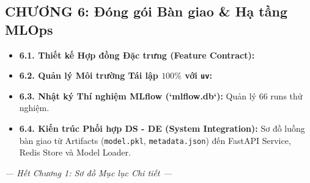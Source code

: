 \subsection*{CHƯƠNG 6: Đóng gói Bàn giao \& Hạ tầng MLOps}
\begin{itemize}[leftmargin=*]
    \item \textbf{6.1. Thiết kế Hợp đồng Đặc trưng (Feature Contract):}
    \item \textbf{6.2. Quản lý Môi trường Tái lập $100\%$ với \texttt{uv}:}
    \item \textbf{6.3. Nhật ký Thí nghiệm MLflow (`mlflow.db`):} Quản lý 66 runs thử nghiệm.
    \item \textbf{6.4. Kiến trúc Phối hợp DS - DE (System Integration):} Sơ đồ luồng bàn giao từ Artifacts (\texttt{model.pkl}, \texttt{metadata.json}) đến FastAPI Service, Redis Store và Model Loader.
\end{itemize}

\vspace{1cm}
\begin{center}
    \textit{--- Hết Chương 1: Sơ đồ Mục lục Chi tiết ---}
\end{center}

